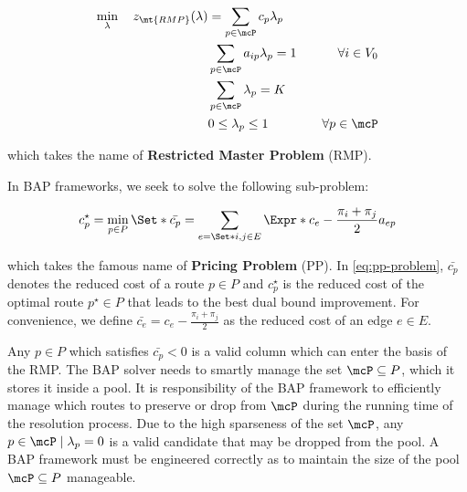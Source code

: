 \begin{align}
	\min_{\lambda} \quad z_\mt{RMP}(\lambda) & = \sum_{p \in \mcP}  c_p \lambda_p \label{eq:rmp-obj-func}                                                                                                                              \\
	                                         & \sum_{p \in \mcP}  a_{ip} \lambda_p = 1                    & \quad \forall i \in V_0                                              \label{eq:rmp-customers-visited-by-exactly-one-route} \\
	                                         & \sum_{p \in \mcP} \lambda_{p} = K\label{eq:rmp-K-routes}                                                                                                                                \\
	                                         & 0 \le \lambda_p \le 1                                      & \quad \forall p \in \mcP \label{eq:rmp-lambda-mip-var-bounds}
\end{align}

which takes the name of \textbf{Restricted Master Problem} (RMP).

In BAP frameworks, we seek to solve the following sub-problem:

\begin{equation}\label{eq:pp-problem}
	{c^\star_p} = \min_{p \in P} \Set*{ \bar{c_p} = \sum_{e = \Set*{i, j} \in E} \Expr*{c_{e} - \frac{\pi_i + \pi_j}{2}} a_{ep}  }
\end{equation}

which takes the famous name of \textbf{Pricing Problem} (PP).
In \cref{eq:pp-problem}, $\bar{c_p}$ denotes the reduced cost of a route $p \in P$
and $c^\star_p$ is the reduced cost of the optimal route $p^\star \in P$
that leads to the best dual bound improvement.
For convenience,
we define $\bar{c_{e}} = c_{e} - \frac{\pi_i + \pi_j}{2}$
as the reduced cost of an edge $e\in E$.

Any $p \in P$ which satisfies $\bar{c_p} < 0$ is a valid column which can enter the basis of the RMP.
The BAP solver needs to smartly manage the set $\mcP \subseteq P$, which it stores it inside a pool.
It is responsibility of the BAP framework to efficiently manage which routes
to preserve or drop from $\mcP$ during the running time of the resolution process.
Due to the high sparseness of the set $\mcP$, any $p \in \mcP \mid \lambda_p = 0$
is a valid candidate that may be dropped from the pool.
A BAP framework must be engineered correctly as to maintain
the size of the pool $\mcP \subseteq P$ manageable.

